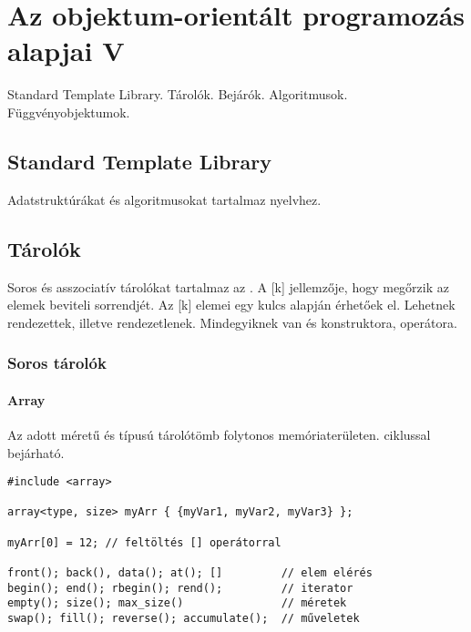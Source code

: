 \documentclass[../../main.tex]{subfiles}
\begin{document}
\section{Az objektum-orientált programozás alapjai V}

\begin{fulltheorem}
  Standard Template Library. Tárolók. Bejárók. Algoritmusok. Függvényobjektumok.
\end{fulltheorem}

\subsection{Standard Template Library}

Adatstruktúrákat és algoritmusokat tartalmaz  nyelvhez.

\subsection{Tárolók}

Soros és asszociatív tárolókat tartalmaz az .
A [k] jellemzője, hogy megőrzik az elemek beviteli
sorrendjét. Az [k] elemei egy kulcs alapján érhetőek
el. Lehetnek rendezettek, illetve rendezetlenek. Mindegyiknek van 
és  konstruktora, \blackc{=} operátora.

\subsubsection*{Soros tárolók}

\paragraph*{Array}

Az  adott méretű és típusú tárolótömb folytonos memóriaterületen.
 ciklussal bejárható.

\begin{verbatim}
#include <array>

array<type, size> myArr { {myVar1, myVar2, myVar3} };

myArr[0] = 12; // feltöltés [] operátorral

front(); back(), data(); at(); []         // elem elérés
begin(); end(); rbegin(); rend();         // iterator
empty(); size(); max_size()               // méretek
swap(); fill(); reverse(); accumulate();  // műveletek
\end{verbatim}
\end{document}
